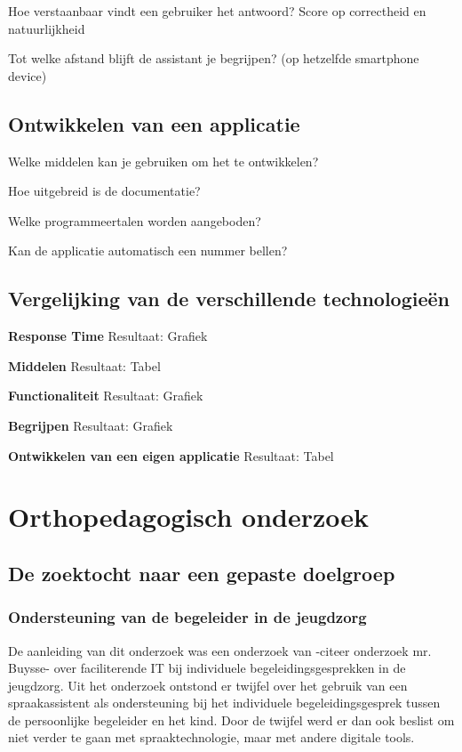 Hoe verstaanbaar vindt een gebruiker het antwoord? Score op correctheid en natuurlijkheid

Tot welke afstand blijft de assistant je begrijpen? (op hetzelfde smartphone device)

\subsection{Ontwikkelen van een applicatie}
\label{sec:ontwikkelen van een applicatie}
Welke middelen kan je gebruiken om het te ontwikkelen?

Hoe uitgebreid is de documentatie?

Welke programmeertalen worden aangeboden?

Kan de applicatie automatisch een nummer bellen?

\subsection{Vergelijking van de verschillende technologieën}
\label{sec:vergelijking van de onderzochte technologieën}
\textbf{Response Time}
Resultaat: Grafiek

\textbf{Middelen}
Resultaat: Tabel

\textbf{Functionaliteit}
Resultaat: Grafiek

\textbf{Begrijpen}
Resultaat: Grafiek

\textbf{Ontwikkelen van een eigen applicatie}
Resultaat: Tabel

\section{Orthopedagogisch onderzoek}
\label{Orthopedagogisch onderzoek}
\subsection{De zoektocht naar een gepaste doelgroep}
\label{De zoektocht naar een gepaste doelgroep}

\subsubsection{Ondersteuning van de begeleider in de jeugdzorg}
\label{ondersteuning van de begeleider in de jeugdzorg}
De aanleiding van dit onderzoek was een onderzoek van -citeer onderzoek mr. Buysse- over faciliterende IT bij individuele begeleidingsgesprekken in de jeugdzorg. Uit het onderzoek ontstond er twijfel over het gebruik van een spraakassistent als ondersteuning bij het individuele begeleidingsgesprek tussen de persoonlijke begeleider en het kind. Door de twijfel werd er dan ook beslist om niet verder te gaan met spraaktechnologie, maar met andere digitale tools.

